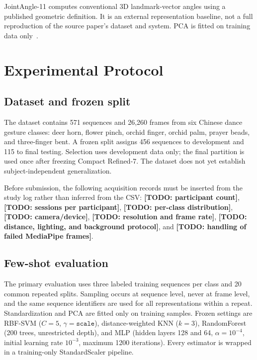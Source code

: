 \documentclass[11pt]{article}
\begin{document}
JointAngle-11 computes conventional 3D landmark-vector angles using a published geometric definition. It is an external representation baseline, not a full reproduction of the source paper's dataset and system. PCA is fitted on training data only~\cite{jolliffe2002pca}.

\begin{table}[t]
\centering
\caption{Representation dimensions and Resample16 encoded sizes.}
\label{tab:dimensions}
\small

\end{table}

\FloatBarrier
\section{Experimental Protocol}

\subsection{Dataset and frozen split}
The dataset contains 571 sequences and 26,260 frames from six Chinese dance gesture classes: deer horn, flower pinch, orchid finger, orchid palm, prayer beads, and three-finger bent. A frozen split assigns 456 sequences to development and 115 to final testing. Selection uses development data only; the final partition is used once after freezing Compact Refined-7. The dataset does not yet establish subject-independent generalization.

Before submission, the following acquisition records must be inserted from the study log rather than inferred from the CSV: \textbf{[TODO: participant count]}, \textbf{[TODO: sessions per participant]}, \textbf{[TODO: per-class distribution]}, \textbf{[TODO: camera/device]}, \textbf{[TODO: resolution and frame rate]}, \textbf{[TODO: distance, lighting, and background protocol]}, and \textbf{[TODO: handling of failed MediaPipe frames]}.

\subsection{Few-shot evaluation}
The primary evaluation uses three labeled training sequences per class and 20 common repeated splits. Sampling occurs at sequence level, never at frame level, and the same sequence identifiers are used for all representations within a repeat. Standardization and PCA are fitted only on training samples. Frozen settings are RBF-SVM ($C=5$, $\gamma=\texttt{scale}$), distance-weighted KNN ($k=3$), RandomForest (200 trees, unrestricted depth), and MLP (hidden layers 128 and 64, $\alpha=10^{-4}$, initial learning rate $10^{-3}$, maximum 1200 iterations). Every estimator is wrapped in a training-only StandardScaler pipeline.
\end{document}
